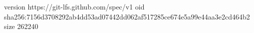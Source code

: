 version https://git-lfs.github.com/spec/v1
oid sha256:7156d3708292ab4dd53ad07442dd062af517285ce674e5a99e44aa3e2cd464b2
size 262240
